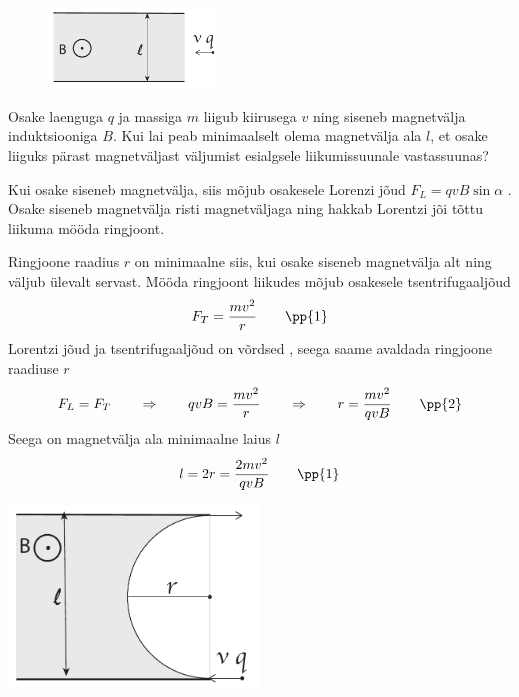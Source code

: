 \setAuthor{}

\begin{figure}
	\vspace{-15pt}
	\begin{center}
		\includegraphics[width = 0.4\textwidth]{2019-v2g-05-yl.pdf}
	\end{center}
\end{figure}


Osake laenguga $q$ ja massiga $m$ liigub kiirusega $v$ ning siseneb  magnetvälja induktsiooniga $B$. Kui lai peab minimaalselt olema magnetvälja ala $l$, et osake liiguks pärast magnetväljast väljumist esialgsele liikumissuunale vastassuunas?





\hint

\solu
Kui osake siseneb magnetvälja, siis mõjub osakesele Lorenzi jõud $F_L = qvB\sin{\alpha}$ . Osake siseneb magnetvälja risti magnetväljaga ning hakkab Lorentzi jõi tõttu liikuma mööda ringjoont. 

Ringjoone raadius $r$ on minimaalne siis, kui osake siseneb magnetvälja alt ning väljub ülevalt servast. Mööda ringjoont liikudes mõjub osakesele tsentrifugaaljõud
\[ F_T = \frac{mv^2}{r} \quad\quad\pp{1} \]
Lorentzi jõud ja tsentrifugaaljõud on võrdsed , seega saame avaldada ringjoone raadiuse $r$
\[ F_L = F_T \quad\quad\Rightarrow\quad\quad qvB = \frac{mv^2}{r} \quad\quad\Rightarrow\quad\quad r = \frac{mv^2}{qvB} \quad\quad\pp{2}\]
Seega on magnetvälja ala minimaalne laius $l$
\[ l = 2r = \frac{2mv^2}{qvB} \quad\quad\pp{1} \]

 \vspace{-20pt}
  \begin{center}
    \includegraphics[width=0.5\textwidth]{2019-v2g-05-sol.pdf}
  \end{center}
  \vspace{-20pt}
\probend